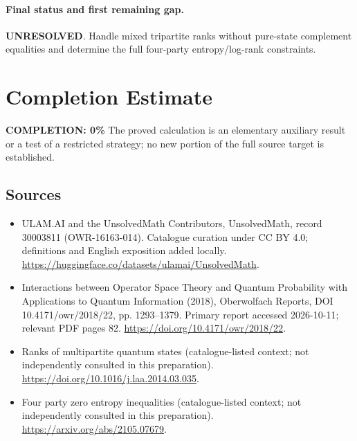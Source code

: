 \documentclass[11pt]{article}
\begin{document}
\paragraph{Final status and first remaining gap.}
\textbf{UNRESOLVED}. Handle mixed tripartite ranks without pure-state complement equalities and determine the full four-party entropy/log-rank constraints.

\section{Completion Estimate}
\noindent\textbf{COMPLETION: 0\%}
The proved calculation is an elementary auxiliary result or a test of a restricted strategy; no new portion of the full source target is established.

\subsection{Sources}
\begin{itemize}
\item[\hypertarget{source:30003811:1}{S1}] ULAM.AI and the UnsolvedMath Contributors, UnsolvedMath, record 30003811 (OWR-16163-014). Catalogue curation under CC BY 4.0; definitions and English exposition added locally.
\url{https://huggingface.co/datasets/ulamai/UnsolvedMath}.
\item[\hypertarget{source:30003811:2}{S2}] Interactions between Operator Space Theory and Quantum Probability with Applications to Quantum Information (2018), Oberwolfach Reports, DOI 10.4171/owr/2018/22, pp. 1293--1379. Primary report accessed 2026-10-11; relevant PDF pages 82.
\url{https://doi.org/10.4171/owr/2018/22}.
\item[\hypertarget{source:30003811:3}{S3}] Ranks of multipartite quantum states (catalogue-listed context; not independently consulted in this preparation).
\url{https://doi.org/10.1016/j.laa.2014.03.035}.
\item[\hypertarget{source:30003811:4}{S4}] Four party zero entropy inequalities (catalogue-listed context; not independently consulted in this preparation).
\url{https://arxiv.org/abs/2105.07679}.
\end{itemize}
\label{end:30003811}
\end{document}

